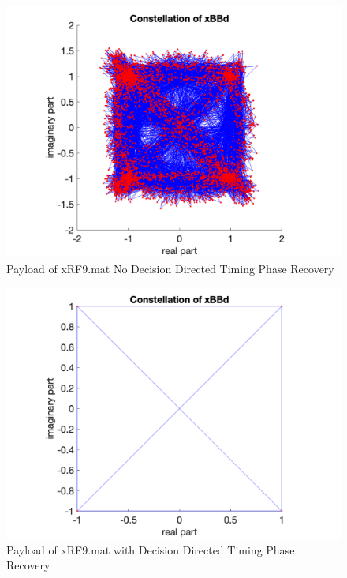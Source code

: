 \begin{figure}[h!]
    \centering
    \includegraphics[scale=0.4]{figures/no-timing-phase-corr-xrf9.png}
    \caption{Payload of xRF9.mat No Decision Directed Timing Phase Recovery}
    \label{fig:no-dd}
\end{figure}
\begin{figure}[h!]
    \centering
    \includegraphics[scale=0.4]{figures/timing-phase-corrected-xrf9.png}
    \caption{Payload of xRF9.mat with Decision Directed Timing Phase Recovery}
    \label{fig:with-dd}
\end{figure}